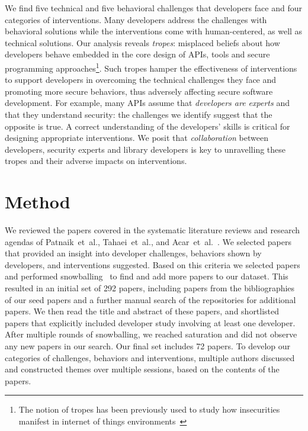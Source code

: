\documentclass[conference]{IEEEtran}
\newcommand{\etal}[0]{et~al{.}}
\begin{document}
We find five technical and five behavioral challenges that developers face and four categories of interventions. Many developers address the challenges with behavioral solutions while the interventions come with human-centered, as well as technical solutions. Our analysis reveals \emph{tropes}: misplaced beliefs about how developers behave embedded in the core design of APIs, tools and secure programming approaches\footnote{The notion of tropes has been previously used to study how insecurities manifest in internet of things environments~\cite{ola2020trope}}. Such tropes hamper the effectiveness of interventions to support developers in overcoming the technical challenges they face and promoting more secure behaviors, thus adversely affecting secure software development. For example, many APIs assume that \emph{developers are experts} and that they understand security: the challenges we identify suggest that the opposite is true. A correct understanding of the developers’ skills is critical for designing appropriate interventions. We posit that \emph{collaboration} between developers, security experts and library developers is key to unravelling these tropes and their adverse impacts on interventions.

\section{Method}

We reviewed the papers covered in the systematic literature reviews and research agendas of Patnaik~\etal{}, Tahaei~\etal{}, and Acar~\etal{}~\cite{acar2016,tahaei2019,patnaik2019}. We selected papers that provided an insight into developer challenges, behaviors shown by developers, and interventions suggested. Based on this criteria we selected papers and performed snowballing~\cite{wohlin2014guidelines} to find and add more papers to our dataset. This resulted in an initial set of 292 papers, including papers from the bibliographies of our seed papers and a further manual search of the repositories for additional papers. We then read the title and abstract of these papers, and shortlisted papers that explicitly included developer study involving at least one developer. After multiple rounds of snowballing, we reached saturation and did not observe any new papers in our search. Our final set includes 72 papers. 
To develop our categories of challenges, behaviors and interventions, 
multiple authors discussed and constructed themes over multiple sessions, based on the contents of the papers.
\end{document}
